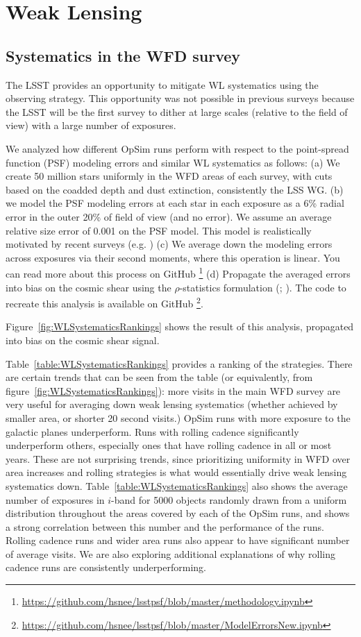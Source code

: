 \section{Weak Lensing}\label{sec:wl}

\subsection{Systematics in the WFD survey}

The LSST provides an opportunity to mitigate WL systematics using the observing strategy. This opportunity was not possible in previous surveys because the LSST will be the first survey to dither at large scales (relative to the field of view) with a large number of exposures.

We analyzed how different OpSim runs perform with respect to the point-spread function (PSF) modeling errors and similar WL systematics as follows: (a) We create 50 million stars uniformly in the WFD areas of each survey, with cuts based on the coadded depth and dust extinction, consistently the LSS WG. (b) we model the PSF modeling errors at each star in each exposure as a 6\% radial error in the outer 20\% of field of view (and no error). We assume an average relative size error of 0.001 on the PSF model. This model is realistically motivated by recent surveys (e.g. \cite{bosche2018}) (c) We average down the modeling errors across exposures via their second moments, where this operation is linear. You can read more about this process on GitHub \footnote{\url{https://github.com/hsnee/lsstpsf/blob/master/methodology.ipynb}} (d) Propagate the averaged errors into bias on the cosmic shear using the $\rho$-statistics formulation (\cite{rowe2010}; \cite{jarvis2016}). The code to recreate this analysis is available on GitHub \footnote{\url{https://github.com/hsnee/lsstpsf/blob/master/ModelErrorsNew.ipynb}}. 

Figure~\ref{fig:WLSystematicsRankings} shows the result of this analysis, propagated into bias on the cosmic shear signal. 

Table~\ref{table:WLSystematicsRankings} provides a ranking of the strategies. There are certain trends that can be seen from the table (or equivalently, from figure~\ref{fig:WLSystematicsRankings}): more visits in the main WFD survey are very useful for averaging down weak lensing systematics (whether achieved by smaller area, or shorter 20 second visits.) OpSim runs with more exposure to the galactic planes underperform. Runs with rolling cadence significantly underperform others, especially ones that have rolling cadence in all or most years. These are not surprising trends, since prioritizing uniformity in WFD over area increases and rolling strategies is what would essentially drive weak lensing systematics down. Table~\ref{table:WLSystematicsRankings} also shows the average number of exposures in $i$-band for 5000 objects randomly drawn from a uniform distribution throughout the areas covered by each of the OpSim runs, and shows a strong correlation between this number and the performance of the runs. Rolling cadence runs and wider area runs also appear to have significant number of average visits. We are also exploring additional explanations of why rolling cadence runs are consistently underperforming.


